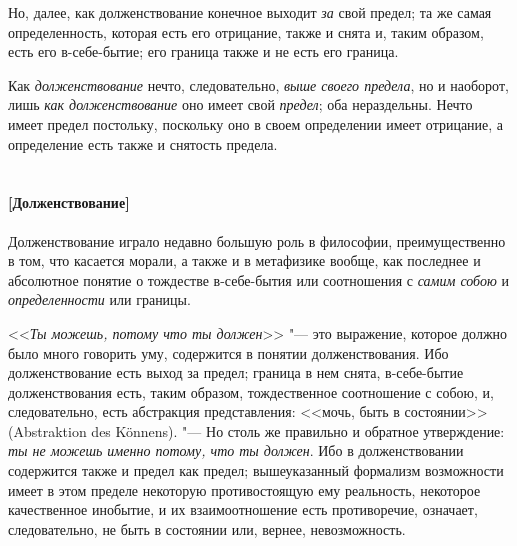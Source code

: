 Но, далее, как долженствование конечное выходит {\em за}
свой предел; та же самая определенность, которая есть его отрицание, также
и снята и, таким образом, есть его в-себе-бытие; его граница также и не
есть его граница.

Как {\em долженствование} нечто, следовательно,
{\em выше своего предела}, но и наоборот, лишь
{\em как долженствование} оно имеет свой
{\em предел}; оба нераздельны. Нечто имеет предел
постольку, поскольку оно в своем определении имеет отрицание, а определение
есть также и снятость предела.

\paragraph[Примечание. Долженствование]%
  {\nopagebreak\\
  \footnotesize [Долженствование]}

Долженствование играло недавно большую роль в философии, преимущественно в
том, что касается морали, а также и в метафизике вообще, как последнее и
абсолютное понятие о тождестве в-себе-бытия или соотношения с
{\em самим собою} и {\em определенности} или границы.

<<{\em Ты можешь, потому что ты должен}>> "--- это выражение,
которое должно было много говорить уму, содержится в понятии долженствования.
Ибо долженствование есть выход за предел; граница в нем снята, в-себе-бытие
долженствования есть, таким образом, тождественное соотношение с собою, и,
следовательно, есть абстракция представления: <<мочь, быть в состоянии>>
(Abstraktion des Könnens). "--- Но столь же правильно и обратное утверждение:
{\em ты не можешь именно потому, что ты должен}. Ибо в
долженствовании содержится также и предел как предел; вышеуказанный
формализм возможности имеет в этом пределе некоторую противостоящую ему
реальность, некоторое качественное инобытие, и их взаимоотношение есть
противоречие, означает, следовательно, не быть в состоянии или, вернее,
невозможность.

